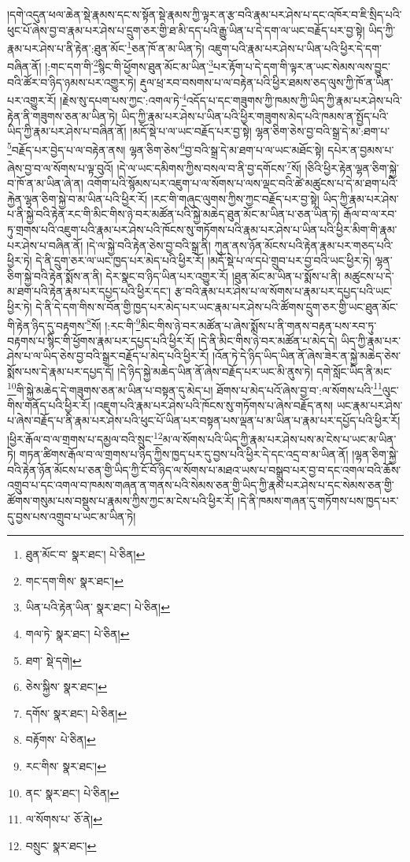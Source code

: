 །དགེ་འདུན་ཕལ་ཆེན་སྡེ་རྣམས་དང་ས་སྟོན་སྡེ་རྣམས་ཀྱི་ལྟར་ན་རྩ་བའི་རྣམ་པར་ཤེས་པ་དང་འཁོར་བ་ཇི་སྲིད་པའི་ཕུང་པོ་ཞེས་བྱ་བ་རྣམ་པར་ཤེས་པ་དྲུག་ཅར་གྱི་ཐ་མི་དད་པའི་རྒྱུ་ཡིན་པ་དེ་དག་ལ་ཡང་བརྗོད་པར་བྱ་སྟེ། ཡིད་ཀྱི་རྣམ་པར་ཤེས་པ་ནི་རྟེན་:ཐུན་མོང་\footnote{ཐུན་མོང་བ་  སྣར་ཐང་།  པེ་ཅིན། }ཅན་ཁོ་ན་མ་ཡིན་ཏེ། འཇུག་པའི་རྣམ་པར་ཤེས་པ་ཡིན་པའི་ཕྱིར་དེ་དག་བཞིན་ནོ། །:གང་དག་གི་\footnote{གང་དག་གིས་  སྣར་ཐང་། }སྙིང་གི་ཕྱོགས་ཐུན་མོང་མ་ཡིན་\footnote{ཡིན་པའི་རྟེན་ཡིན་  སྣར་ཐང་།  པེ་ཅིན། }པར་རྟོག་པ་དེ་དག་གི་ལྟར་ན་ཡང་སེམས་ལས་བྱུང་བའི་ཚོར་བ་ཉིད་ཉམས་པར་འགྱུར་ཏེ། རྡུལ་ཕྲ་རབ་བསགས་པ་ལ་བརྟེན་པའི་ཕྱིར་ཐམས་ཅད་ལུས་ཀྱི་ཁོ་ན་ཡིན་པར་འགྱུར་རོ། །རྗེས་སུ་དཔག་པས་ཀྱང་:འགལ་ཏེ་\footnote{གལ་ཏེ་  སྣར་ཐང་།  པེ་ཅིན། }འདོད་པ་དང་གཟུགས་ཀྱི་ཁམས་ཀྱི་ཡིད་ཀྱི་རྣམ་པར་ཤེས་པའི་རྟེན་ནི་གཟུགས་ཅན་མ་ཡིན་ཏེ། ཡིད་ཀྱི་རྣམ་པར་ཤེས་པ་ཡིན་པའི་ཕྱིར་གཟུགས་མེད་པའི་ཁམས་ན་སྤྱོད་པའི་ཡིད་ཀྱི་རྣམ་པར་ཤེས་པ་བཞིན་ནོ། །མདོ་སྡེ་པ་ལ་ཡང་བརྗོད་པར་བྱ་སྟེ། ལྷན་ཅིག་ཅེས་བྱ་བའི་སྒྲ་དེ་མ་:ཐག་པ་\footnote{ཐག་  སྡེ་དགེ། }བརྗོད་པར་བྱེད་པ་ལ་བརྟེན་ནས། ལྷན་ཅིག་ཅེས་\footnote{ཅེས་སྐྱིས་  སྣར་ཐང་། }བྱ་བའི་སྒྲ་དེ་མ་ཐག་པ་ལ་ཡང་མཐོང་སྟེ། དཔེར་ན་བྱམས་པ་ཞེས་བྱ་བ་ལ་སོགས་པ་ལྟ་བུའོ། །དེ་ལ་ཡང་དམིགས་ཀྱིས་བསལ་བ་ནི་བྱ་དགོངས་\footnote{དགོས་  སྣར་ཐང་།  པེ་ཅིན། }སོ། །ཅིའི་ཕྱིར་རྟེན་ལྷན་ཅིག་སྐྱེ་བ་ཁོ་ན་མ་ཡིན་ཞེ་ན། འགོག་པའི་སྙོམས་པར་འཇུག་པ་ལ་སོགས་པ་ལས་ལྡང་བའི་ཚེ་མཚུངས་པ་དེ་མ་ཐག་པའི་རྐྱེན་ལྷན་ཅིག་སྐྱེ་བ་མ་ཡིན་པའི་ཕྱིར་རོ། །རང་གི་གཞུང་ལུགས་ཀྱིས་ཀྱང་བརྗོད་པར་བྱ་སྟེ། ཡིད་ཀྱི་རྣམ་པར་ཤེས་པ་ནི་སྐྱེ་བའི་རྟེན་རང་གི་མིང་གིས་ཉེ་བར་མཚོན་པའི་སྐྱེ་མཆེད་ཐུན་མོང་མ་ཡིན་པ་ཅན་ཡིན་ཏེ། རྒོལ་བ་ལ་རབ་ཏུ་གྲགས་པའི་འཇུག་པའི་རྣམ་པར་ཤེས་པའི་ཁོངས་སུ་གཏོགས་པའི་རྣམ་པར་ཤེས་པ་ཡིན་པའི་ཕྱིར་མིག་གི་རྣམ་པར་ཤེས་པ་བཞིན་ནོ། །དེ་ལ་སྐྱེ་བའི་རྟེན་ཅེས་བྱ་བའི་སྒྲ་ནི། ཀུན་ནས་ཉོན་མོངས་པའི་རྟེན་རྣམ་པར་གཅད་པའི་ཕྱིར་ཏེ། དེ་ནི་དྲུག་ཅར་ལ་ཡང་ཁྱད་པར་མེད་པའི་ཕྱིར་རོ། །མདོ་སྡེ་པ་ལ་དཔེ་གྲུབ་པར་བྱ་བའི་ཡང་ཕྱིར་ཏེ། ལྷན་ཅིག་སྐྱེ་བའི་རྟེན་སྨོས་ན་ནི། དེར་སྣང་བ་ཉིད་ཡིན་པར་འགྱུར་རོ། །ཐུན་མོང་མ་ཡིན་པ་སྨོས་པ་ནི། མཚུངས་པ་དེ་མ་ཐག་པའི་རྟེན་རྣམ་པར་དཔྱད་པའི་ཕྱིར་དང་། རྩ་བའི་རྣམ་པར་ཤེས་པ་ལ་སོགས་པ་རྣམ་པར་དཔྱད་པའི་ཡང་ཕྱིར་ཏེ། དེ་ནི་དེ་དག་གིས་ས་བོན་གྱི་ཁྱད་པར་མེད་པར་ཡང་རྣམ་པར་ཤེས་པའི་ཚོགས་དྲུག་ཅར་གྱི་ཡང་ཐུན་མོང་གི་རྟེན་ཉིད་དུ་བརྟགས་\footnote{བརྟོགས་  པེ་ཅིན། }སོ། །:རང་གི་\footnote{རང་གིས་  སྣར་ཐང་། }མིང་གིས་ཉེ་བར་མཚོན་པ་ཞེས་སྨོས་པ་ནི་གནས་བརྟན་པས་རབ་ཏུ་བརྟགས་པ་སྙིང་གི་ཕྱོགས་རྣམ་པར་དཔྱད་པའི་ཕྱིར་རོ། །དེ་ནི་མིང་གིས་ཉེ་བར་མཚོན་པ་མེད་དེ། ཡིད་ཀྱི་རྣམ་པར་ཤེས་པ་ལ་ཡིད་ཅེས་བྱ་བའི་སྒྲར་བརྗོད་པ་མེད་པའི་ཕྱིར་རོ། །འོན་ཏེ་དེ་ཉིད་ཡིད་ཡིན་ནོ་ཞེས་ཟེར་ན་སྐྱེ་མཆེད་ཅེས་སྨོས་པས་དེ་རྣམ་པར་དཔྱད་དོ། །དེ་ཉིད་སྐྱེ་མཆེད་ཡིན་ནོ་ཞེས་བརྗོད་པར་ཡང་མི་ནུས་ཏེ། དགེ་སློང་ཡིད་ནི་མང་\footnote{ནང་  སྣར་ཐང་།  པེ་ཅིན། }གི་སྐྱེ་མཆེད་དེ་གཟུགས་ཅན་མ་ཡིན་པ་བསྟན་དུ་མེད་པ། ཐོགས་པ་མེད་པའོ་ཞེས་བྱ་བ་:ལ་སོགས་པའི་\footnote{ལ་སོགས་པ་  ཅོ་ནེ། }ལུང་གིས་གནོད་པའི་ཕྱིར་རོ། །འཇུག་པའི་རྣམ་པར་ཤེས་པའི་ཁོངས་སུ་གཏོགས་པ་ཞེས་བརྗོད་ནས། ཡང་རྣམ་པར་ཤེས་པ་ཞེས་བརྗོད་པ་ནི་རྣམ་པར་ཤེས་པའི་ཕུང་པོ་ཡིན་པར་བསྟན་པས་ལྡན་པ་མ་ཡིན་པ་རྣམ་པར་དཔྱོད་པའི་ཕྱིར་རོ། །ཕྱིར་རྒོལ་བ་ལ་གྲགས་པ་དམྱལ་བའི་སྲུང་\footnote{བསྲུང་  སྣར་ཐང་། }མ་ལ་སོགས་པའི་ཡིད་ཀྱི་རྣམ་པར་ཤེས་པས་མ་ངེས་པ་ཡང་མ་ཡིན་ཏེ། གཏན་ཚིགས་རྒོལ་བ་ལ་གྲགས་པ་ཉིད་ཀྱིས་ཁྱད་པར་དུ་བྱས་པའི་ཕྱིར་དེ་དང་འདྲ་བ་མ་ཡིན་ནོ། །ལྷན་ཅིག་སྐྱེ་བའི་རྟེན་ཉོན་མོངས་པ་ཅན་གྱི་ཡིད་ཀྱི་ངོ་བོ་ཉིད་ལ་སོགས་པ་མཐའ་ཡས་པ་བསྒྲུབ་པར་བྱ་བ་དང་འགལ་བའི་ཆོས་འགྲུབ་པ་དང་འགལ་བ་ཁམས་གཞན་ན་གནས་པའི་སེམས་ཅན་གྱི་ཡིད་ཀྱི་རྣམ་པར་ཤེས་པ་དང་སེམས་ཅན་གྱི་ཚོགས་གསུམ་པས་བསྡུས་པ་རྣམས་ཀྱིས་ཀྱང་མ་ངེས་པའི་ཕྱིར་རོ། །དེ་ནི་ཁམས་གཞན་དུ་གཏོགས་པས་ཁྱད་པར་དུ་བྱས་པས་འགྲུབ་པ་ཡང་མ་ཡིན་ཏེ། 